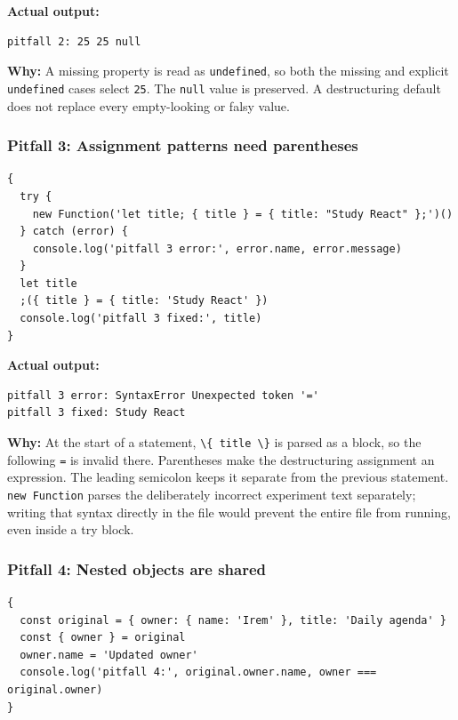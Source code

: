 \documentclass[
  11pt,
]{article}
\newcommand{\passthrough}[1]{#1}
\begin{document}
\textbf{Actual output:}

\begin{lstlisting}
pitfall 2: 25 25 null
\end{lstlisting}

\textbf{Why:} A missing property is read as
\passthrough{\lstinline!undefined!}, so both the missing and explicit
\passthrough{\lstinline!undefined!} cases select
\passthrough{\lstinline!25!}. The \passthrough{\lstinline!null!} value
is preserved. A destructuring default does not replace every
empty-looking or falsy value.

\subsubsection{Pitfall 3: Assignment patterns need
parentheses}\label{pitfall-3-assignment-patterns-need-parentheses}

\begin{lstlisting}
{
  try {
    new Function('let title; { title } = { title: "Study React" };')()
  } catch (error) {
    console.log('pitfall 3 error:', error.name, error.message)
  }
  let title
  ;({ title } = { title: 'Study React' })
  console.log('pitfall 3 fixed:', title)
}
\end{lstlisting}

\textbf{Actual output:}

\begin{lstlisting}
pitfall 3 error: SyntaxError Unexpected token '='
pitfall 3 fixed: Study React
\end{lstlisting}

\textbf{Why:} At the start of a statement,
\passthrough{\lstinline!\{ title \}!} is parsed as a block, so the
following \passthrough{\lstinline!=!} is invalid there. Parentheses make
the destructuring assignment an expression. The leading semicolon keeps
it separate from the previous statement.
\passthrough{\lstinline!new Function!} parses the deliberately incorrect
experiment text separately; writing that syntax directly in the file
would prevent the entire file from running, even inside a try block.

\subsubsection{Pitfall 4: Nested objects are
shared}\label{pitfall-4-nested-objects-are-shared}

\begin{lstlisting}
{
  const original = { owner: { name: 'Irem' }, title: 'Daily agenda' }
  const { owner } = original
  owner.name = 'Updated owner'
  console.log('pitfall 4:', original.owner.name, owner === original.owner)
}
\end{lstlisting}
\end{document}
